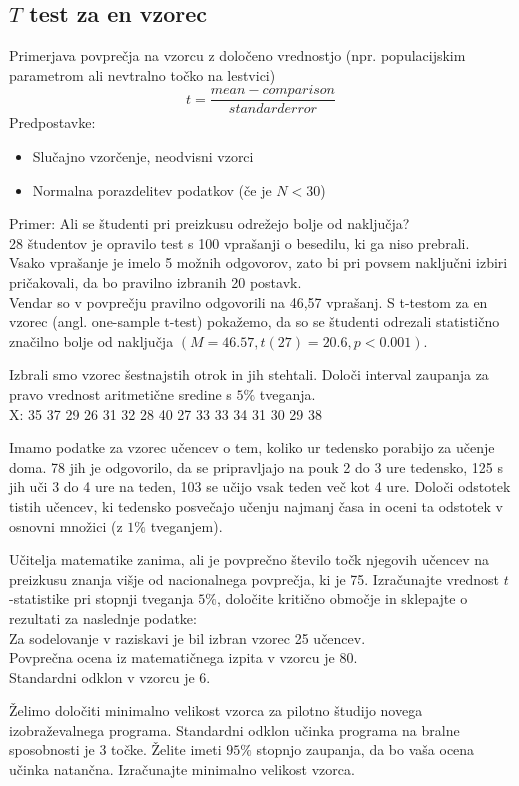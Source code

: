 \subsection*{$T$ test za en vzorec}

Primerjava povprečja na vzorcu z določeno vrednostjo (npr. populacijskim parametrom ali nevtralno točko na lestvici)\\
\[t = \frac{mean-comparison}{standard error}\]
Predpostavke:
\begin{itemize}
\item Slučajno vzorčenje, neodvisni vzorci
\item Normalna porazdelitev podatkov (če je $N < 30$)
\end{itemize}

Primer: Ali se študenti pri preizkusu odrežejo bolje od naključja?\\
28 študentov je opravilo test s 100 vprašanji o besedilu, ki ga niso prebrali.\\
Vsako vprašanje je imelo 5 možnih odgovorov, zato bi pri povsem naključni izbiri pričakovali, da bo pravilno izbranih 20 postavk.\\
Vendar so v povprečju pravilno odgovorili na 46,57 vprašanj. S t-testom za en vzorec (angl. one-sample t-test) pokažemo, da so se študenti odrezali statistično značilno bolje od naključja $(M=46.57, t(27)=20.6, p < 0.001)$.

\begin{Vaje}{1}
    Izbrali smo vzorec šestnajstih otrok in jih stehtali. Določi interval zaupanja za pravo vrednost aritmetične sredine s $5\%$ tveganja.\\
    X: 35 37 29	26 31 32 28	40 27 33 33	34 31 30 29	38
\end{Vaje}
\begin{Vaje}{2}
Imamo podatke za vzorec učencev o tem, koliko ur tedensko porabijo za učenje doma. 78 jih je odgovorilo, da se pripravljajo na pouk 2 do 3 ure tedensko, 125 s jih uči 3 do 4 ure na teden, 103 se učijo vsak teden več kot 4 ure. Določi odstotek tistih učencev, ki tedensko posvečajo učenju najmanj časa in oceni ta odstotek v osnovni množici (z $1\%$ tveganjem).
\end{Vaje}
\begin{Vaje}{3}
Učitelja matematike zanima, ali je povprečno število točk njegovih učencev na preizkusu znanja višje od nacionalnega povprečja, ki je 75. Izračunajte vrednost $t$-statistike pri stopnji tveganja $5 \%$, določite kritično območje in sklepajte o rezultati za naslednje podatke:\\
Za sodelovanje v raziskavi je bil izbran vzorec 25 učencev.\\
Povprečna ocena iz matematičnega izpita v vzorcu je 80.\\
Standardni odklon v vzorcu je 6.
\end{Vaje}
\begin{Vaje}{4}
    Želimo določiti minimalno velikost vzorca za pilotno študijo novega izobraževalnega programa. Standardni odklon učinka programa na bralne sposobnosti je 3 točke. Želite imeti $95\%$ stopnjo zaupanja, da bo vaša ocena učinka natančna. Izračunajte minimalno velikost vzorca.
\end{Vaje}